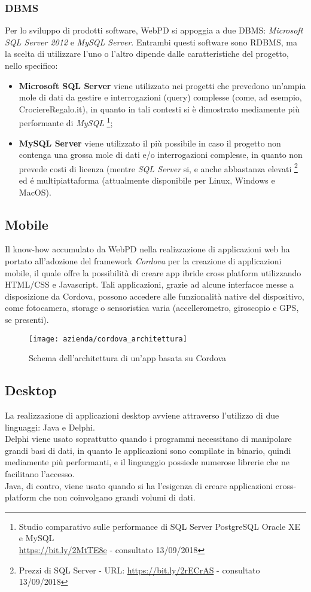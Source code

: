 \subsubsection{DBMS}
Per lo sviluppo di prodotti software, WebPD si appoggia a due \gls{DBMS}: \textit{Microsoft SQL Server 2012} e \textit{MySQL Server}. Entrambi questi software sono \gls{RDBMS}, ma la scelta di utilizzare l'uno o l'altro dipende dalle caratteristiche del progetto, nello specifico: \begin{itemize}
	\item \textbf{Microsoft SQL Server} viene utilizzato nei progetti che prevedono un'ampia mole di dati da gestire e interrogazioni (query) complesse (come, ad esempio, CrociereRegalo.it), in quanto in tali contesti si è dimostrato mediamente più performante di \textit{MySQL}
	\footnote{Studio comparativo sulle performance di SQL Server PostgreSQL Oracle XE e MySQL\\\url{https://bit.ly/2MtTE8e} - consultato 13/09/2018};
	\item \textbf{MySQL Server} viene utilizzato il più possibile in caso il progetto non contenga una grossa mole di dati e/o interrogazioni complesse, in quanto non prevede costi di licenza (mentre \textit{SQL Server} si, e anche abbastanza elevati \footnote{Prezzi di SQL Server - URL: \url{https://bit.ly/2rECrAS} - consultato 13/09/2018} ed é multipiattaforma (attualmente disponibile per Linux, Windows e MacOS).
\end{itemize}

\subsection{Mobile}
Il know-how accumulato da WebPD nella realizzazione di applicazioni web ha portato all'adozione del framework \textit{Cordova} per la creazione di applicazioni mobile, il quale offre la possibilità di creare app ibride cross platform utilizzando HTML/CSS e Javascript. Tali applicazioni, grazie ad alcune interfacce messe a disposizione da Cordova, possono accedere alle funzionalità native del dispositivo, come fotocamera, storage o sensoristica varia (accellerometro, giroscopio e GPS, se presenti).

\begin{figure}[!h] 
	\centering 
	\texttt{[image: azienda/cordova\_architettura]} 
	\caption{Schema dell'architettura di un'app basata su Cordova}
\end{figure}

\subsection{Desktop}
La realizzazione di applicazioni desktop avviene attraverso l'utilizzo di due linguaggi: Java e Delphi.\\
Delphi viene usato soprattutto quando i programmi necessitano di manipolare grandi basi di dati, in quanto le applicazioni sono compilate in binario, quindi mediamente più performanti, e il linguaggio possiede numerose librerie che ne facilitano l'accesso.\\
Java, di contro, viene usato quando si ha l'esigenza di creare applicazioni cross-platform che non coinvolgano grandi volumi di dati.

